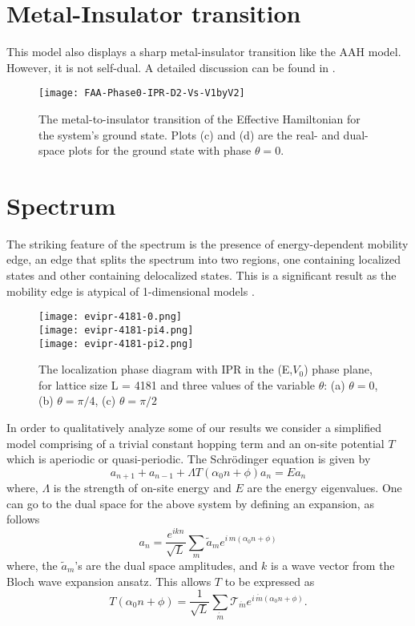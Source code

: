 \section{Metal-Insulator transition}
This model also displays a sharp metal-insulator transition like the AAH model. However, it is not self-dual. A detailed discussion can be found
in \cite{mishra2016phase}.

\begin{figure}[h]
 \caption{The metal-to-insulator transition of the Effective Hamiltonian for the system’s ground state.  Plots (c) and (d) are the real- and dual-space plots for the
ground state with phase $\theta = 0$.}
\texttt{[image: FAA-Phase0-IPR-D2-Vs-V1byV2]}
\centering
\end{figure}

\section{Spectrum}
The striking feature of the spectrum is the presence of energy-dependent mobility edge, an edge that splits the spectrum into two regions, one containing localized states and 
other containing delocalized states. This is a significant result as the mobility edge is atypical of 1-dimensional models \cite{mishra2016phase}.

\begin{figure}[ht]
\centering
\texttt{[image: evipr-4181-0.png]}\\
\texttt{[image: evipr-4181-pi4.png]}\\
\texttt{[image: evipr-4181-pi2.png]}
\caption{The localization phase diagram with IPR in the (E,$V_0$) phase plane, for lattice size L = 4181 and three values of the variable $\theta$:
(a) $\theta = 0$, (b) $\theta = \pi/4$, (c) $\theta = \pi/2$}
\label{fig:mobedge}
\end{figure}

In order to qualitatively analyze some of our results we  consider a simplified model comprising of a trivial constant hopping term and an on-site potential $T$ which is aperiodic or quasi-periodic. The Schr\"odinger equation is given by  
\begin{equation}
\label{eq:AA}
 a_{n+1} + a_{n-1} + \Lambda  T(\alpha_0 n + \phi)a_n= Ea_n
\end{equation}
where,  $\Lambda$ is the strength of
on-site energy and $E$ are  the energy eigenvalues. One can go to the dual
space for the above system by defining an expansion, as follows
\begin{equation}
\label{trans1}
 a_n = \frac{ e^{ikn}}{\sqrt L}\displaystyle\sum_m \tilde{a}_m
 e^{i\,m(\alpha_0 n + \phi)}
\end{equation}
where, the $\tilde{a}_m$'s are the dual space amplitudes, and $k$ is a wave vector
from the Bloch wave expansion ansatz.  This  allows 
 $T$  to be expressed as
\begin{equation}
\label{trans2}
  T(\alpha_0 n+ \phi) = \frac{1}{\sqrt L}\displaystyle\sum_{\acute{m}}\mathcal{T}_{\acute{m}} e^{i\,\acute{m}(\alpha_0 n + \phi)}.
\end{equation}

